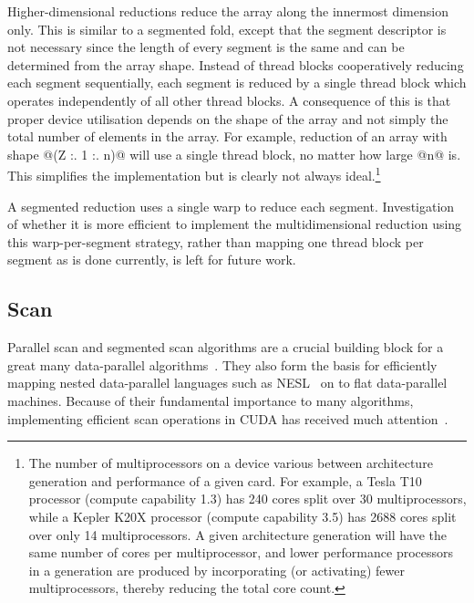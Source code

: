 Higher-dimensional reductions reduce the array along the innermost dimension
only. This is similar to a segmented fold, except that the segment descriptor is
not necessary since the length of every segment is the same and can be
determined from the array shape. Instead of thread blocks cooperatively reducing
each segment sequentially, each segment is reduced by a single thread block
which operates independently of all other thread blocks. A consequence of this
is that proper device utilisation depends on the shape of the array and not
simply the total number of elements in the array. For example, reduction of an
array with shape @(Z :. 1 :. n)@ will use a single thread block, no matter
how large @n@ is. This simplifies the implementation but is clearly not
always ideal.\footnote{The number of multiprocessors on a device various between
architecture generation and performance of a given card. For example, a Tesla
T10 processor (compute capability 1.3) has 240 cores split over 30
multiprocessors, while a Kepler K20X processor (compute capability 3.5) has 2688
cores split over only 14 multiprocessors. A given architecture generation will
have the same number of cores per multiprocessor, and lower performance
processors in a generation are produced by incorporating (or activating) fewer
multiprocessors, thereby reducing the total core count.}

A segmented reduction uses a single warp to reduce each segment. Investigation
of whether it is more efficient to implement the multidimensional reduction
using this warp-per-segment strategy, rather than mapping one thread block per
segment as is done currently, is left for future work.


\subsection{Scan}
\label{sec:parallel_scan}

Parallel scan and segmented scan algorithms are a crucial building block for a
great many data-parallel algorithms~\cite{Blelloch:1990ts,Chatterjee:1990vj}.
They also form the basis for efficiently mapping nested data-parallel languages
such as NESL~\cite{Blelloch:1995ut,Blelloch:1996jx} on to flat data-parallel
machines. Because of their fundamental importance to many algorithms,
implementing efficient scan operations in CUDA has received much
attention~\cite{Sengupta:2007tc,Sengupta:2008ut,Dotsenko:2008fo,Harris:2012fy}.


